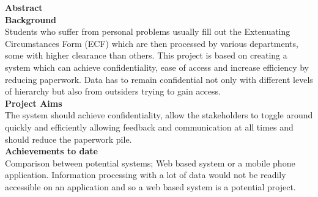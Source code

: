 \documentclass[../main.tex]{subfiles}
\begin{document}
\raggedright

\textbf{{\Huge Abstract}}\\[8mm]

\textbf{{\large Background}} \\[2mm]

Students who suffer from personal problems usually fill out the Extenuating Circumstances Form (ECF) which are then processed by various departments, some with higher clearance than others. This project is based on creating a system which can achieve confidentiality, ease of access and increase efficiency by reducing paperwork. Data has to remain confidential not only with different levels of hierarchy but also from outsiders trying to gain access.  \\[4mm]

\textbf{{\large Project Aims}} \\[2mm]

The system should achieve confidentiality, allow the stakeholders to toggle around quickly and efficiently allowing feedback and communication at all times and should reduce the paperwork pile. \\[4mm]


\textbf{{\large Achievements to date}} \\[2mm]

Comparison between potential systems; Web based system or a mobile phone application. Information processing with a lot of data would not be readily accessible on an application and so a web based system is a potential project.\\[4mm]
\end{document}
